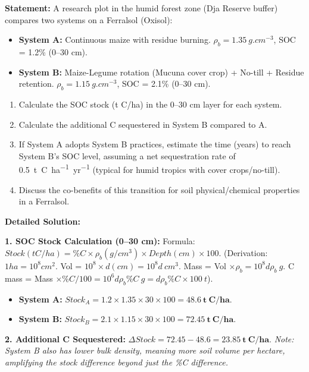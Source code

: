 \documentclass[11pt]{article}
\begin{document}
\begin{exoresolu}
\textbf{Statement:} A research plot in the humid forest zone (Dja Reserve buffer) compares two systems on a Ferralsol (Oxisol):
\begin{itemize}
\item \textbf{System A:} Continuous maize with residue burning. $\rho_b = \SI{1.35}{g.cm^{-3}}$, SOC = 1.2\% (0--30 cm).
\item \textbf{System B:} Maize-Legume rotation (Mucuna cover crop) + No-till + Residue retention. $\rho_b = \SI{1.15}{g.cm^{-3}}$, SOC = 2.1\% (0--30 cm).
\end{itemize}
\begin{enumerate}
\item Calculate the SOC stock (t C/ha) in the 0--30 cm layer for each system.
\item Calculate the additional C sequestered in System B compared to A.
\item If System A adopts System B practices, estimate the time (years) to reach System B's SOC level, assuming a net sequestration rate of \SI{0.5}{t C.ha^{-1}.yr^{-1}} (typical for humid tropics with cover crops/no-till).
\item Discuss the co-benefits of this transition for soil physical/chemical properties in a Ferralsol.
\end{enumerate}

\tcblower
\textbf{Detailed Solution:}

\noindent\textbf{1. SOC Stock Calculation (0--30 cm):}
Formula: $Stock (t C/ha) = \%C \times \rho_b (g/cm^3) \times Depth (cm) \times 100$.
(Derivation: $1 ha = 10^8 cm^2$. Vol = $10^8 \times d (cm) = 10^8 d\ cm^3$. Mass = Vol $\times \rho_b = 10^8 d \rho_b\ g$. C mass = Mass $\times \%C/100 = 10^6 d \rho_b \%C\ g = d \rho_b \%C \times 100\ t$).

\begin{itemize}
\item \textbf{System A:} $Stock_A = 1.2 \times 1.35 \times 30 \times 100 = \mathbf{48.6\ t\ C/ha}$.
\item \textbf{System B:} $Stock_B = 2.1 \times 1.15 \times 30 \times 100 = \mathbf{72.45\ t\ C/ha}$.
\end{itemize}

\noindent\textbf{2. Additional C Sequestered:}
$\Delta Stock = 72.45 - 48.6 = \mathbf{23.85\ t\ C/ha}$.
\textit{Note: System B also has lower bulk density, meaning more soil volume per hectare, amplifying the stock difference beyond just the \%C difference.}


\end{exoresolu}
\end{document}

